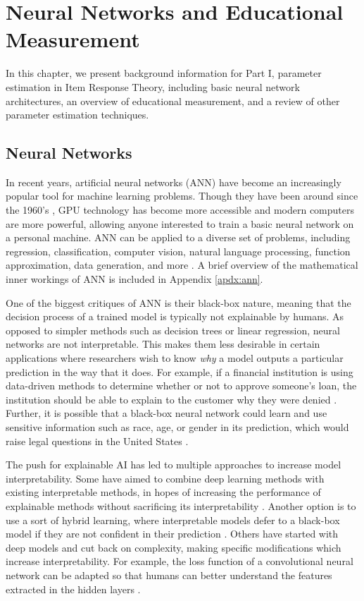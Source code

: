 \chapter{Neural Networks and Educational Measurement} \label{ch:irt_background}
In this chapter, we present background information for Part I, parameter estimation in Item Response Theory, including basic neural network architectures, an overview of educational measurement, and a review of other parameter estimation techniques.

\section*{Neural Networks}
In recent years, artificial neural networks (ANN) have become an increasingly popular tool for machine learning problems. Though they have been around since the 1960's \cite{rosenblatt1961}, GPU technology has become more accessible and modern computers are more powerful, allowing anyone interested to train a basic neural network on a personal machine. ANN can be applied to a diverse set of problems, including regression, classification, computer vision, natural language processing, function approximation, data generation, and more \cite{hammerstrom1993} \cite{zhang2000}. A brief overview of the mathematical inner workings of ANN is included in Appendix \ref{apdx:ann}.

One of the biggest critiques of ANN is their black-box nature, meaning that the decision process of a trained model is typically not explainable by humans. As opposed to simpler methods such as decision trees or linear regression, neural networks are not interpretable. This makes them less desirable in certain applications where researchers wish to know \textit{why} a model outputs a particular prediction in the way that it does. For example, if a financial institution is using data-driven methods to determine whether or not to approve someone's loan, the institution should be able to explain to the customer why they were denied \cite{chou2020}. Further, it is possible that a black-box neural network could learn and use sensitive information such as race, age, or gender in its prediction, which would raise legal questions in the United States \cite{ecoa}.

The push for explainable AI has led to multiple approaches to increase model interpretability. Some have aimed to combine deep learning methods with existing interpretable methods, in hopes of increasing the performance of explainable methods without sacrificing its interpretability \cite{goebel2018}. Another option is to use a sort of hybrid learning, where interpretable models defer to a black-box model if they are not confident in their prediction \cite{rafique2020}. Others have started with deep models and cut back on complexity, making specific modifications which increase interpretability. For example, the loss function of a convolutional neural network can be adapted so that humans can better understand the features extracted in the hidden layers \cite{zhang2018interpretable}. 

